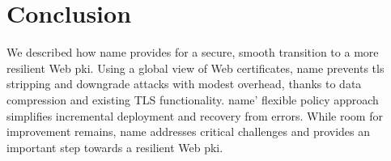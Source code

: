 \section{Conclusion}
\label{sec:conclusion}

We described how \ac{name} provides for a secure, smooth
transition to a more resilient Web \ac{pki}. Using a global view of Web
certificates, %
\ac{name} prevents \ac{tls} stripping and downgrade attacks
with modest overhead, thanks to
data compression and existing TLS functionality.
\ac{name}' flexible policy approach simplifies incremental deployment
and recovery from errors.
While room for improvement remains,
\ac{name} addresses critical challenges and provides an important step towards a resilient Web \ac{pki}. 
